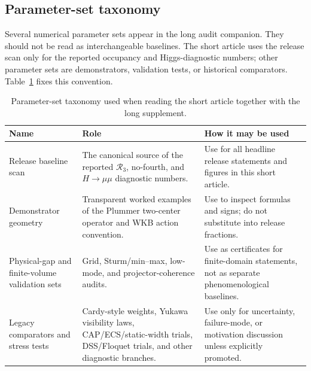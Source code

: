 \documentclass[11pt,a4paper]{article}
\newcommand{\Rthree}{\mathcal{R}_3}
\begin{document}
\subsection{Parameter-set taxonomy}

Several numerical parameter sets appear in the long audit companion.
They should not be read as interchangeable baselines.
The short article uses the release scan only for the reported occupancy and Higgs-diagnostic numbers; other parameter sets are demonstrators, validation tests, or historical comparators.
Table~\ref{tab:param_taxonomy} fixes this convention.

\begin{table}[htbp]
\centering
\caption{Parameter-set taxonomy used when reading the short article together with the long supplement.}
\label{tab:param_taxonomy}
\small
\setlength{\tabcolsep}{4pt}
\renewcommand{\arraystretch}{1.12}
\begin{tabular}{@{}l l l@{}}
\toprule
\parbox[t]{0.22\textwidth}{\raggedright \textbf{Name}} & \parbox[t]{0.34\textwidth}{\raggedright \textbf{Role}} & \parbox[t]{0.32\textwidth}{\raggedright \textbf{How it may be used}} \\
\midrule
\parbox[t]{0.22\textwidth}{\raggedright Release baseline scan} &
\parbox[t]{0.34\textwidth}{\raggedright The canonical source of the reported \(\Rthree\), no-fourth, and \(H\to\mu\mu\) diagnostic numbers.} &
\parbox[t]{0.32\textwidth}{\raggedright Use for all headline release statements and figures in this short article.} \\
\parbox[t]{0.22\textwidth}{\raggedright Demonstrator geometry} &
\parbox[t]{0.34\textwidth}{\raggedright Transparent worked examples of the Plummer two-center operator and WKB action convention.} &
\parbox[t]{0.32\textwidth}{\raggedright Use to inspect formulas and signs; do not substitute into release fractions.} \\
\parbox[t]{0.22\textwidth}{\raggedright Physical-gap and finite-volume validation sets} &
\parbox[t]{0.34\textwidth}{\raggedright Grid, Sturm/min--max, low-mode, and projector-coherence audits.} &
\parbox[t]{0.32\textwidth}{\raggedright Use as certificates for finite-domain statements, not as separate phenomenological baselines.} \\
\parbox[t]{0.22\textwidth}{\raggedright Legacy comparators and stress tests} &
\parbox[t]{0.34\textwidth}{\raggedright Cardy-style weights, Yukawa visibility laws, CAP/ECS/static-width trials, DSS/Floquet trials, and other diagnostic branches.} &
\parbox[t]{0.32\textwidth}{\raggedright Use only for uncertainty, failure-mode, or motivation discussion unless explicitly promoted.} \\
\bottomrule
\end{tabular}
\end{table}
\end{document}
